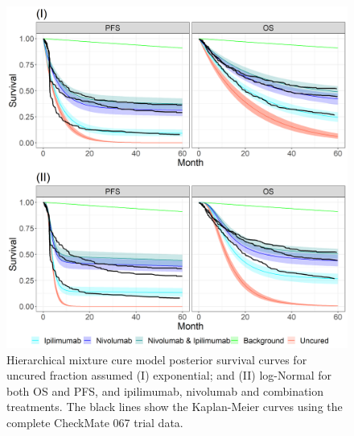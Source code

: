 \documentclass[AMA,STIX1COL]{WileyNJD-v2}
\begin{document}

\begin{figure}
\centering
\includegraphics[width=0.7\linewidth]{plot_S_exp_lognormal_grid_cf_hier.png}
\caption{\label{fig:S_exp_lnorm_cf_hier} Hierarchical mixture cure model posterior survival curves for uncured fraction assumed (I) exponential; and (II) log-Normal for both OS and PFS, and ipilimumab, nivolumab and combination treatments. The black lines show the Kaplan-Meier curves using the complete CheckMate 067 trial data.}
\end{figure}
\end{document}
